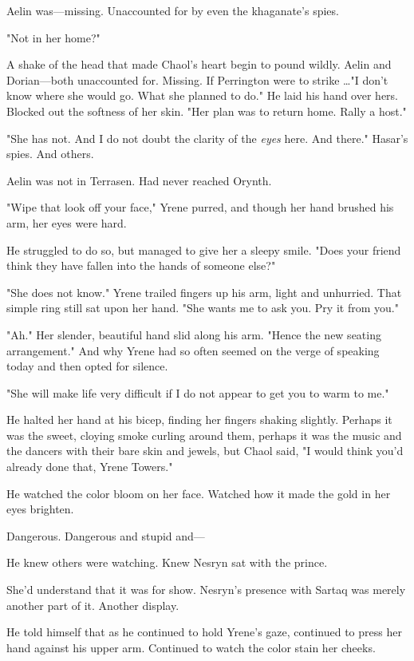 Aelin was---missing. Unaccounted for by even the khaganate's spies.

"Not in her home?"

A shake of the head that made Chaol's heart begin to pound wildly. Aelin and Dorian---both unaccounted for. Missing. If Perrington were to strike
\ldots"I don't know where she would go. What she planned to do." He laid his hand over hers. Blocked out the softness of her skin. "Her plan was to return home. Rally a host."

"She has not. And I do not doubt the clarity of the \emph{eyes} here. And there." Hasar's spies. And others.

Aelin was not in Terrasen. Had never reached Orynth.

"Wipe that look off your face," Yrene purred, and though her hand brushed his arm, her eyes were hard.

He struggled to do so, but managed to give her a sleepy smile. "Does your friend think they have fallen into the hands of someone else?"

"She does not know." Yrene trailed fingers up his arm, light and unhurried. That simple ring still sat upon her hand. "She wants me to ask you. Pry it from you."

"Ah." Her slender, beautiful hand slid along his arm. "Hence the new seating arrangement." And why Yrene had so often seemed on the verge of speaking today and then opted for silence.

"She will make life very difficult if I do not appear to get you to warm to me."

He halted her hand at his bicep, finding her fingers shaking slightly. Perhaps it was the sweet, cloying smoke curling around them, perhaps it was the music and the dancers with their bare skin and jewels, but Chaol said, "I would think you'd already done that, Yrene Towers."

He watched the color bloom on her face. Watched how it made the gold in her eyes brighten.

Dangerous. Dangerous and stupid and---

He knew others were watching. Knew Nesryn sat with the prince.

She'd understand that it was for show. Nesryn's presence with Sartaq was merely another part of it. Another display.

He told himself that as he continued to hold Yrene's gaze, continued to press her hand against his upper arm. Continued to watch the color stain her cheeks.

